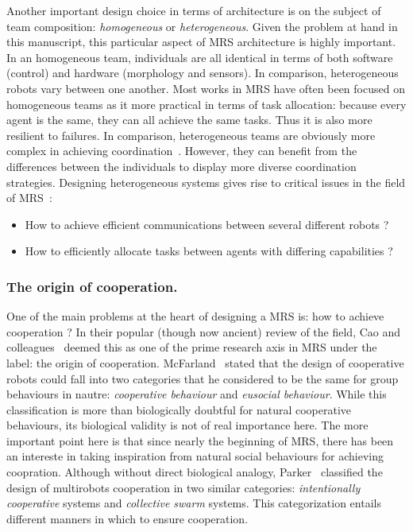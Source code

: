     Another important design choice in terms of architecture is on the subject of team composition: \emph{homogeneous} or \emph{heterogeneous}. Given the problem at hand in this manuscript, this particular aspect of MRS architecture is highly important. In an homogeneous team, individuals are all identical in terms of both software (control) and hardware (morphology and sensors). In comparison, heterogeneous robots vary between one another. Most works in MRS have often been focused on homogeneous teams as it more practical in terms of task allocation: because every agent is the same, they can all achieve the same tasks. Thus it is also more resilient to failures. In comparison, heterogeneous teams are obviously more complex in achieving coordination~\parencite{Parker1994}. However, they can benefit from the differences between the individuals to display more diverse coordination strategies. Designing heterogeneous systems gives rise to critical issues in the field of MRS~\parencite{Parker2008}:

    \begin{itemize}
      \item{How to achieve efficient communications between several different robots ?~\parencite{Jung2000}}
      \item{How to efficiently allocate tasks between agents with differing capabilities ?~\parencite{Parker2003}}
    \end{itemize}


    \subsubsection{The origin of cooperation.} One of the main problems at the heart of designing a MRS is: how to achieve cooperation ? In their popular (though now ancient) review of the field, Cao and colleagues~\parencite{Cao1997} deemed this as one of the prime research axis in MRS under the label: the origin of cooperation. McFarland~\parencite{McFarland1996} stated that the design of cooperative robots could fall into two categories that he considered to be the same for group behaviours in nautre: \emph{cooperative behaviour} and \emph{eusocial behaviour}. While this classification is more than biologically doubtful for natural cooperative behaviours, its biological validity is not of real importance here. The more important point here is that since nearly the beginning of MRS, there has been an intereste in taking inspiration from natural social behaviours for achieving coopration. Although without direct biological analogy, Parker~\parencite{Parker2008} classified the design of multirobots cooperation in two similar categories: \emph{intentionally cooperative} systems and \emph{collective swarm} systems. This categorization entails different manners in which to ensure cooperation.

